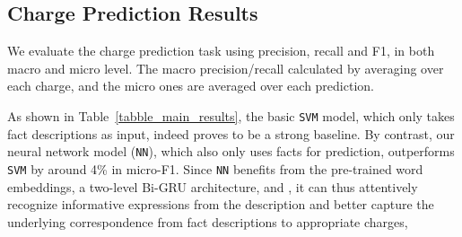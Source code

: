 

\subsection{Charge Prediction Results}
\label{sec_main_results}
We evaluate the charge prediction task using precision, recall and F1, in both macro and micro level.
The macro precision/recall  calculated by averaging over %
each charge, and the micro ones are averaged  over each prediction. %



As shown in Table~\ref{tabble_main_results}, %
the basic \texttt{SVM} model,
which only takes fact descriptions as input, indeed proves to be a strong baseline.
By contrast, our  neural network model (\texttt{NN}), which also only uses facts for prediction, outperforms \texttt{SVM} 
by around 4\% in micro-F1.
Since \texttt{NN} benefits from the pre-trained word embeddings,
a two-level Bi-GRU architecture, and ,
it can thus attentively recognize informative expressions from the description and 
better capture the underlying correspondence from fact descriptions to appropriate charges,
%

